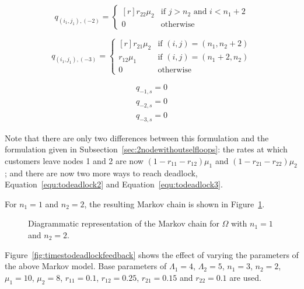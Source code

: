 \documentclass{article}
\numberwithin{equation}{section}
\begin{document}
\begin{equation}\label{equ:todeadlock3}
  q_{(i_1, j_1), (-2)} = \left\{
  \begin{matrix*}[ r ]
    r_{22}\mu_2 & \text{if } j > n_2 \text{ and } i < n_1 + 2 \\
    0 & \text{otherwise}
  \end{matrix*}
  \right.
\end{equation}

\begin{equation}
  q_{(i_1, j_1), (-3)} = \left\{
  \begin{matrix*}[ r ]
    r_{21}\mu_2 & \text{if } (i, j) = (n_1, n_2 + 2) \\
    r_{12}\mu_1 & \text{if } (i, j) = (n_1 + 2, n_2) \\
    0 & \text{otherwise}
  \end{matrix*}
  \right.
\end{equation}

\begin{align}
  q_{-1, s} = 0 \\
  q_{-2, s} = 0 \\
  q_{-3, s} = 0
\end{align}

Note that there are only two differences between this formulation and the formulation given in Subsection~\ref{sec:2nodewithoutselfloops}: the rates at which customers leave nodes 1 and 2 are now $(1-r_{11}-r_{12})\mu_1$ and $(1-r_{21}-r_{22})\mu_2$; and there are now two more ways to reach deadlock, Equation~\ref{equ:todeadlock2} and Equation~\ref{equ:todeadlock3}.

For $n_1 = 1$ and $n_2 = 2$, the resulting Markov chain is shown in Figure~\ref{fig:2nodeMCfeedback}.

\begin{figure}[!htbp]
    \begin{center}
    
    \end{center}
    \caption{Diagrammatic representation of the Markov chain for $\Omega$ with $n_1=1$ and $n_2=2$.}
    \label{fig:2nodeMCfeedback}
\end{figure}

Figure~\ref{fig:timestodeadlockfeedback} shows the effect of varying the parameters of the above Markov model.
Base parameters of $\Lambda_1 = 4$, $\Lambda_2 = 5$, $n_1 = 3$, $n_2 = 2$, $\mu_1 = 10$, $\mu_2 = 8$, $r_{11} = 0.1$, $r_{12} = 0.25$, $r_{21} = 0.15$ and $r_{22} = 0.1$ are used.
\end{document}
